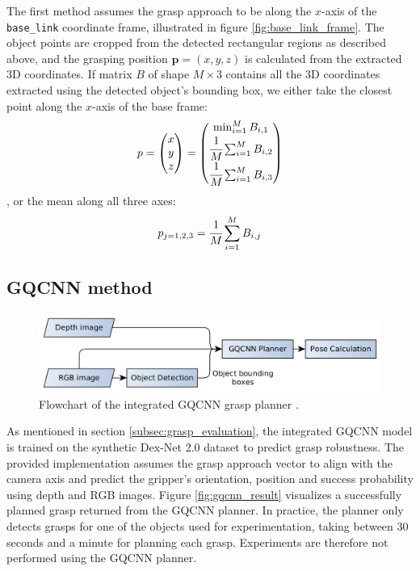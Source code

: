 \documentclass[runningheads]{../llncs}
\begin{document}
The first method assumes the grasp approach to be along the $ x $-axis of the \texttt{base\_link} coordinate frame,
illustrated in figure \ref{fig:base_link_frame}. The object points are cropped from the detected rectangular regions as
described above, and the grasping position $ \mathbf{p} = (x, y, z) $ is calculated from the extracted 3D coordinates.
If matrix $ B $ of shape $ M \times 3 $ contains all the 3D coordinates extracted using the detected object's bounding
box, we either take the closest point along the $ x $-axis of the base frame:
\begin{equation} \label{eq:pose_estimation_min}
p = \left( \begin{matrix} x \\ y \\ z \end{matrix} \right)
  = \left( \begin{matrix} \min_{i = 1}^M B_{i,1} \\
                          \cfrac{1}{M} \sum_{i = 1}^{M} B_{i,2} \\
                          \cfrac{1}{M} \sum_{i = 1}^{M} B_{i,3} \end{matrix} \right)
\end{equation}
, or the mean along all three axes:
\begin{equation} \label{eq:pose_estimation_mean}
p_{j=1,2,3} = \cfrac{1}{M} \sum_{i = 1}^{M} B_{i,j}
\end{equation}

\subsection{GQCNN method}
\begin{figure}[h!]
    \centering
    \includegraphics[width=\textwidth]{grasp_plan_gqcnn}
    \caption{Flowchart of the integrated GQCNN grasp planner \cite{mahler2017}.}
    \label{fig:grasp_plan_gqcnn}
\end{figure}

As mentioned in section \ref{subsec:grasp_evaluation}, the integrated GQCNN model \cite{mahler2017} is trained on the
synthetic Dex-Net 2.0 dataset to predict grasp robustness. The provided implementation assumes the grasp approach
vector to align with the camera axis and predict the gripper's orientation, position and success probability using
depth and RGB images. Figure \ref{fig:gqcnn_result} visualizes a successfully planned grasp returned from the GQCNN
planner. In practice, the planner only detects grasps for one of the objects used for experimentation, taking between
30 seconds and a minute for planning each grasp. Experiments are therefore not performed using the GQCNN planner.
\end{document}
